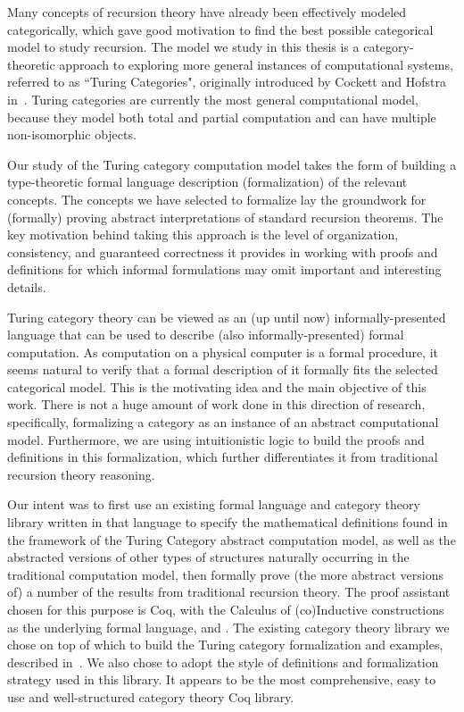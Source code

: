 \documentclass{entcs} \usepackage{entcsmacro}
\begin{document}
Many concepts of recursion theory have already been effectively modeled categorically, which gave good motivation to find the best possible categorical model to study recursion. The model we study in this thesis is a category-theoretic approach to exploring more general instances of computational systems, referred to as ``Turing Categories", originally introduced by Cockett and Hofstra in~\cite{Turing}. Turing categories are currently the most general computational model, because they model both total and partial computation and can have multiple non-isomorphic objects. 

Our study of the Turing category computation model takes the form of building a type-theoretic formal language description (formalization) of the relevant concepts. The concepts we have selected to formalize lay the groundwork for (formally) proving abstract interpretations of standard recursion theorems. The key motivation behind taking this approach is the level of organization, consistency, and guaranteed correctness it provides in working with proofs and definitions for which informal formulations may omit important and interesting details. %

Turing category theory can be viewed as an (up until now) informally-presented language that can be used to describe (also informally-presented) formal computation. As computation on a physical computer is a formal procedure, it seems natural to verify that a formal description of it formally fits the selected categorical model. This is the motivating idea and the main objective of this work. There is not a huge amount of work done in this direction of research, specifically, formalizing a category as an instance of an abstract computational model. Furthermore, we are using intuitionistic logic to build the proofs and definitions in this formalization, which further differentiates it from traditional recursion theory reasoning. 

Our intent was to first use an existing formal language and category theory library written in that language to specify the mathematical definitions found in the framework of the Turing Category abstract computation model, as well as the abstracted versions of other types of structures naturally occurring in the traditional computation model, then formally prove (the more abstract versions of) a number of the results from traditional recursion theory. The proof assistant chosen for this purpose is Coq, with the Calculus of (co)Inductive constructions as the underlying formal language, and . The existing category theory library we chose on top of which to build the Turing category formalization and examples, described in~\cite{timanyNewLib}. We also chose to adopt the style of definitions and formalization strategy used in this library. It appears to be the most comprehensive, easy to use and well-structured category theory Coq library. 
\end{document}
